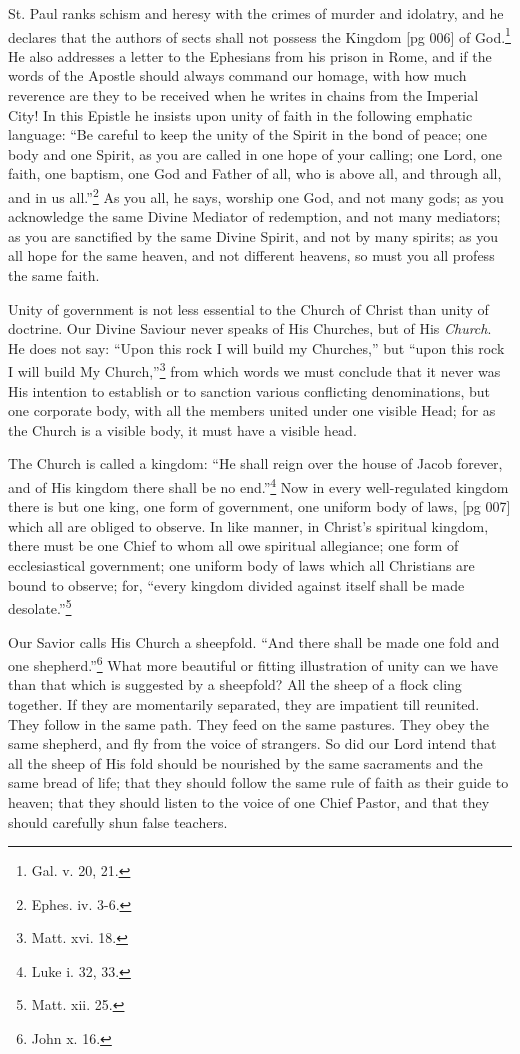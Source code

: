 St. Paul ranks schism and heresy with the
crimes of murder and idolatry, and he declares
that the authors of sects shall not possess the Kingdom
[pg 006]
of God.\footnote{Gal. v. 20,
21.} He also addresses a letter to the
Ephesians from his prison in Rome, and if the
words of the Apostle should always command our
homage, with how much reverence are they to be
received when he writes in chains from the Imperial
City! In this Epistle he insists upon unity of
faith in the following emphatic language: “Be
careful to keep the unity of the Spirit in the
bond of peace; one body and one Spirit, as you
are called in one hope of your calling; one Lord,
one faith, one baptism, one God and Father
of all, who is above all, and through all, and
in us all.”\footnote{Ephes. iv.
3-6.} As you all, he says, worship one
God, and not many gods; as you acknowledge the
same Divine Mediator of redemption, and not
many mediators; as you are sanctified by the same
Divine Spirit, and not by many spirits; as you all
hope for the same heaven, and not different
heavens, so must you all profess the same faith.

Unity of government is not less essential to the
Church of Christ than unity of doctrine. Our
Divine Saviour never speaks of His Churches, but
of His \emph{Church}. He does not say: “Upon this rock
I will build my Churches,” but “upon this rock I
will build My Church,”\footnote{Matt. xvi.
18.} from which words we
must conclude that it never was His intention to
establish or to sanction various conflicting denominations,
but one corporate body, with all the members
united under one visible Head; for as the
Church is a visible body, it must have a visible
head.

The Church is called a kingdom: “He shall
reign over the house of Jacob forever, and of His
kingdom there shall be no end.”\footnote{Luke
i. 32, 33.} Now in every
well-regulated kingdom there is but one king, one
form of government, one uniform body of laws,
[pg 007]
which all are obliged to observe. In like manner,
in Christ's spiritual kingdom, there must be one
Chief to whom all owe spiritual allegiance; one
form of ecclesiastical government; one uniform
body of laws which all Christians are bound to observe;
for, “every kingdom divided against itself
shall be made desolate.”\footnote{Matt. xii. 25.}

Our Savior calls His Church a sheepfold. “And
there shall be made one fold and one shepherd.”\footnote{John x. 16.}
What more beautiful or fitting illustration
of unity can we have than that which is suggested
by a sheepfold? All the sheep of a flock
cling together. If they are momentarily separated,
they are impatient till reunited. They follow in
the same path. They feed on the same pastures.
They obey the same shepherd, and fly from the
voice of strangers. So did our Lord intend that
all the sheep of His fold should be nourished by
the same sacraments and the same bread of life;
that they should follow the same rule of faith as
their guide to heaven; that they should listen to
the voice of one Chief Pastor, and that they should
carefully shun false teachers.

